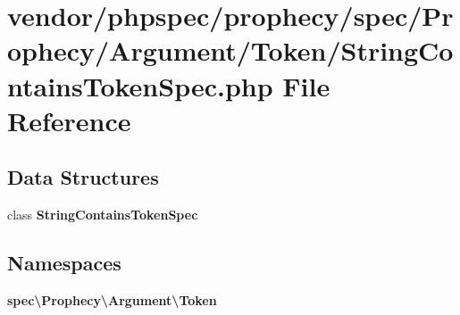 \section{vendor/phpspec/prophecy/spec/\+Prophecy/\+Argument/\+Token/\+String\+Contains\+Token\+Spec.php File Reference}
\label{_string_contains_token_spec_8php}
\subsection*{Data Structures}
\begin{DoxyCompactItemize}
\item 
class {\bf String\+Contains\+Token\+Spec}
\end{DoxyCompactItemize}
\subsection*{Namespaces}
\begin{DoxyCompactItemize}
\item 
 {\bf spec\textbackslash{}\+Prophecy\textbackslash{}\+Argument\textbackslash{}\+Token}
\end{DoxyCompactItemize}
